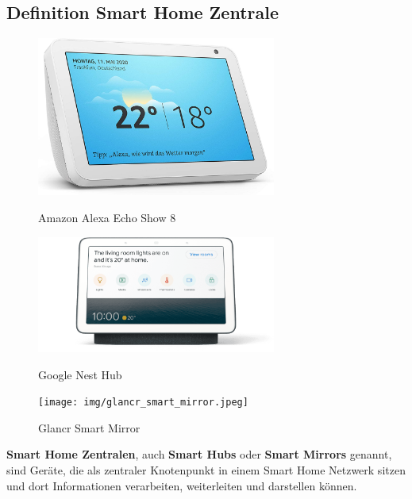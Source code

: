 \subsection{Definition Smart Home Zentrale}
 	\begin{figure}[ht!]
 		\centering
 		\begin{minipage}[t]{0.3\linewidth}
 			\centering
 			\includegraphics[width=0.7\textwidth]{img/alexa_echo_show8.jpg}
 			\caption[Amazon Alexa Echo Show 8]{Amazon Alexa Echo Show 8}
 			\label{fig:alexa-echo-show8}
 		\end{minipage}
 		\hfill
 		\begin{minipage}[t]{0.3\linewidth}
 			\centering
 			\includegraphics[width=0.7\textwidth]{img/google_nest_hub.png}
 			\caption[Google Nest Hub]{Google Nest Hub}
 			\label{fig:google-nest-hub}
 		\end{minipage}
 		\hfill
 		\begin{minipage}[t]{0.3\linewidth}
 			\centering
 			\texttt{[image: img/glancr\_smart\_mirror.jpeg]}
 			\caption[Glancr Smart Mirror]{Glancr Smart Mirror}
 			\label{fig:glancr-smart-mirror}
 		\end{minipage}
 	\end{figure}
 	\textbf{Smart Home Zentralen}, auch \textbf{Smart Hubs} oder \textbf{Smart Mirrors} genannt, sind Geräte, die als zentraler Knotenpunkt in einem Smart Home Netzwerk sitzen und dort Informationen verarbeiten, weiterleiten und darstellen können.\par
